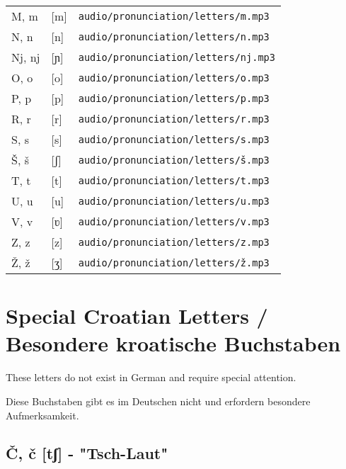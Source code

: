\begin{center}
\begin{tabular}{lll}
M, m & [m] & \texttt{audio/pronunciation/letters/m.mp3} \\
N, n & [n] & \texttt{audio/pronunciation/letters/n.mp3} \\
Nj, nj & [ɲ] & \texttt{audio/pronunciation/letters/nj.mp3} \\
O, o & [o] & \texttt{audio/pronunciation/letters/o.mp3} \\
P, p & [p] & \texttt{audio/pronunciation/letters/p.mp3} \\
R, r & [r] & \texttt{audio/pronunciation/letters/r.mp3} \\
S, s & [s] & \texttt{audio/pronunciation/letters/s.mp3} \\
Š, š & [ʃ] & \texttt{audio/pronunciation/letters/š.mp3} \\
T, t & [t] & \texttt{audio/pronunciation/letters/t.mp3} \\
U, u & [u] & \texttt{audio/pronunciation/letters/u.mp3} \\
V, v & [ʋ] & \texttt{audio/pronunciation/letters/v.mp3} \\
Z, z & [z] & \texttt{audio/pronunciation/letters/z.mp3} \\
Ž, ž & [ʒ] & \texttt{audio/pronunciation/letters/ž.mp3} \\
\bottomrule
\end{tabular}
\end{center}

\section{Special Croatian Letters / Besondere kroatische Buchstaben}

These letters do not exist in German and require special attention.

Diese Buchstaben gibt es im Deutschen nicht und erfordern besondere Aufmerksamkeit.

\subsection{Č, č [tʃ] - "Tsch-Laut"}

